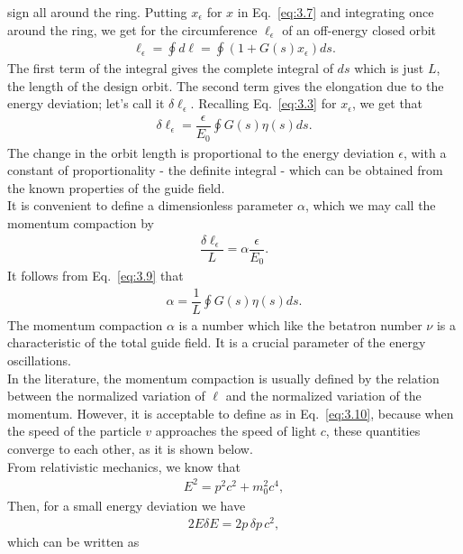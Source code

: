 \documentclass[../sands-adaptation.tex]{subfiles}
\begin{document}
sign all around the ring. Putting $x_\epsilon$ for $x$ in Eq.~\eqref{eq:3.7} and integrating
once around the ring, we get for the circumference $\ell_\epsilon$ of an off-energy
closed orbit
\begin{align}
	\ell_\epsilon = \oint d\ell = \oint (1 + G(s)x_\epsilon)ds.
\end{align}
The first term of the integral gives the complete integral of $ds$ which is just $L$, the length of the design orbit. The second term gives the elongation due to the energy deviation; let's call it $\delta \ell_\epsilon$. Recalling Eq.~\eqref{eq:3.3} for $x_\epsilon$, we get that
\begin{align} \label{eq:3.9}
	\delta\ell_\epsilon = \dfrac{\epsilon}{E_0} \oint G(s) \eta(s) ds.
\end{align}
The change in the orbit length is proportional to the energy deviation $\epsilon$, with a constant of proportionality - the definite integral - which can be obtained from the known properties of the guide field.\\
It is convenient to define a dimensionless parameter $\alpha$, which we may call the momentum compaction by
\begin{align}\label{eq:3.10}
	\dfrac{\delta \ell_\epsilon}{L} = \alpha \dfrac{\epsilon}{E_0}.
\end{align}
It follows from Eq.~\eqref{eq:3.9} that
\begin{align}\label{eq:3.11}
	\alpha = \dfrac{1}{L} \oint G(s) \eta(s) ds.
\end{align}
The momentum compaction $\alpha$ is a number which like the betatron number $\nu$ is a characteristic of the total guide field. It is a crucial parameter of the energy oscillations.\\
In the literature, the momentum compaction is usually defined by the relation between the normalized variation of $\ell$ and the normalized variation of the momentum. However, it is acceptable to define as in Eq.~\eqref{eq:3.10}, because when the speed of the particle $v$ approaches the speed of light $c$, these quantities converge to each other, as it is shown below.\\
From relativistic mechanics, we know that
\begin{align}\label{eq:}
	E^2 = p^2c^2 + m_0^2 c^4,
\end{align}
Then, for a small energy deviation we have
\begin{align}
	2 E \delta E = 2p \,\delta p \, c^2,
\end{align}
which can be written as
\end{document}

